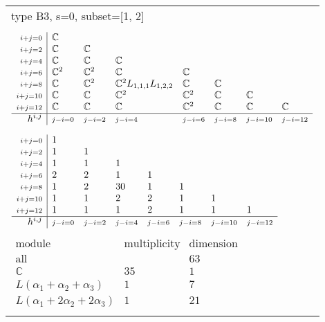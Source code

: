 \documentclass[crop,border=2mm]{standalone}
\begin{document}
\begin{tabular}{l}
{\huge type B3, s=0, subset=[1, 2]}\\ \\


$\displaystyle
\begin{array}{r|l l l l l l l}
	{\scriptstyle i+j=0}&\mathbb{C}&&&&&&\\
	{\scriptstyle i+j=2}&\mathbb{C}&\mathbb{C}&&&&&\\
	{\scriptstyle i+j=4}&\mathbb{C}&\mathbb{C}&\mathbb{C}&&&&\\
	{\scriptstyle i+j=6}&\mathbb{C}^{2}&\mathbb{C}^{2}&\mathbb{C}&\mathbb{C}&&&\\
	{\scriptstyle i+j=8}&\mathbb{C}&\mathbb{C}^{2}&\mathbb{C}^{2}L_{1,1,1}L_{1,2,2}&\mathbb{C}&\mathbb{C}&&\\
	{\scriptstyle i+j=10}&\mathbb{C}&\mathbb{C}&\mathbb{C}^{2}&\mathbb{C}^{2}&\mathbb{C}&\mathbb{C}&\\
	{\scriptstyle i+j=12}&\mathbb{C}&\mathbb{C}&\mathbb{C}&\mathbb{C}^{2}&\mathbb{C}&\mathbb{C}&\mathbb{C}\\
	\hline h^{i,j}&{\scriptstyle j-i=0}&{\scriptstyle j-i=2}&{\scriptstyle j-i=4}&{\scriptstyle j-i=6}&{\scriptstyle j-i=8}&{\scriptstyle j-i=10}&{\scriptstyle j-i=12}
\end{array}
$ \\ \\


$\displaystyle
\begin{array}{r|l l l l l l l}
	{\scriptstyle i+j=0}&1&&&&&&\\
	{\scriptstyle i+j=2}&1&1&&&&&\\
	{\scriptstyle i+j=4}&1&1&1&&&&\\
	{\scriptstyle i+j=6}&2&2&1&1&&&\\
	{\scriptstyle i+j=8}&1&2&30&1&1&&\\
	{\scriptstyle i+j=10}&1&1&2&2&1&1&\\
	{\scriptstyle i+j=12}&1&1&1&2&1&1&1\\
	\hline h^{i,j}&{\scriptstyle j-i=0}&{\scriptstyle j-i=2}&{\scriptstyle j-i=4}&{\scriptstyle j-i=6}&{\scriptstyle j-i=8}&{\scriptstyle j-i=10}&{\scriptstyle j-i=12}
\end{array}
$ \\ \\


$\displaystyle
\begin{array}{rll}
	\text{module}&\text{multiplicity}&\text{dimension} \\ \hline \text{all}&&63 \\
	\mathbb{C}&35&1\\
	L\left(\alpha_{1}+\alpha_{2}+\alpha_{3}\right)&1&7\\
	L\left(\alpha_{1}+ 2\alpha_{2}+ 2\alpha_{3}\right)&1&21
\end{array}
$ \\ \\

\end{tabular}
\end{document}
